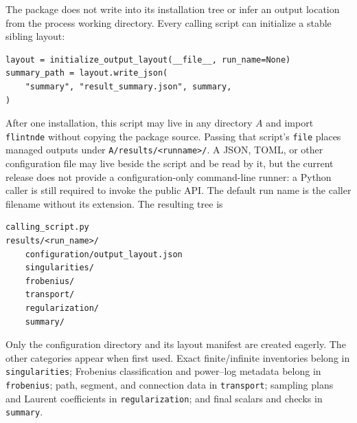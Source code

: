 \documentclass[11pt]{article}
\renewcommand{\_}{\origunderscore\allowbreak}
\begin{document}
The package does not write into its installation tree or infer an output location from the
process working directory.  Every calling script can initialize a stable sibling layout:
\begin{verbatim}
layout = initialize_output_layout(__file__, run_name=None)
summary_path = layout.write_json(
    "summary", "result_summary.json", summary,
)
\end{verbatim}
After one installation, this script may live in any directory $A$ and import
\texttt{flintnde} without copying the package source.  Passing that script's
\texttt{\_\_file\_\_} places managed outputs under
\texttt{A/results/<run\_name>/}.  A JSON, TOML, or other configuration file may live beside
the script and be read by it, but the current release does not provide a configuration-only
command-line runner: a Python caller is still required to invoke the public API.
The default run name is the caller filename without its extension.  The resulting tree is
\begin{verbatim}
calling_script.py
results/<run_name>/
    configuration/output_layout.json
    singularities/
    frobenius/
    transport/
    regularization/
    summary/
\end{verbatim}
Only the configuration directory and its layout manifest are created eagerly.  The other
categories appear when first used.  Exact finite/infinite inventories belong in
\texttt{singularities}; Frobenius classification and power--log metadata belong in
\texttt{frobenius}; path, segment, and connection data in \texttt{transport}; sampling
plans and Laurent coefficients in \texttt{regularization}; and final scalars and checks in
\texttt{summary}.
\end{document}
